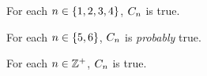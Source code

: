 \documentclass{paper}
\begin{document}
\begin{flushleft}
\begin{remark}
For each $n \in \{1, 2, 3, 4\}$, $C_{n}$ is true.
\end{remark}

\begin{remark}
For each $n \in \{5, 6\}$, $C_{n}$ is
\emph{probably} true.
\end{remark}

\begin{conjecture}
For each $n \in \mathbb{Z}^+$, $C_{n}$ is true.
\end{conjecture}


\end{flushleft}
\end{document}
